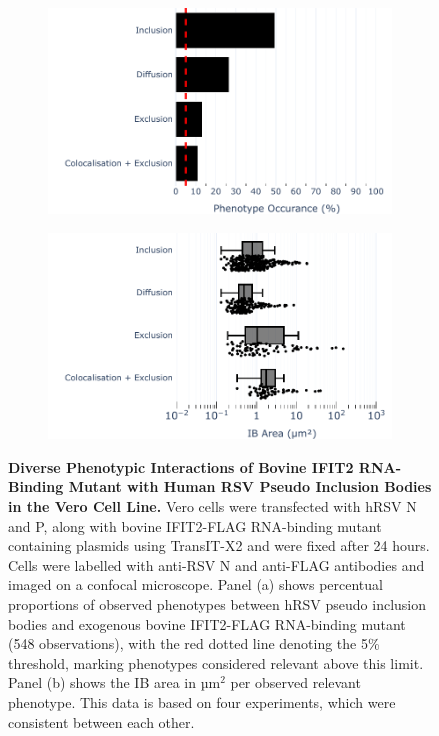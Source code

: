 \begin{figure}
    \begin{subfigure}{0.495\textwidth}
        \caption{}
        \includegraphics[width=1\linewidth]{09. Chapter 4/Figs/01. pIB/03. IFIT2/05. IFIT2-RNA binding mutant/02. pIB/01. bar_bi2f24_hnhp.pdf} 
    \end{subfigure}
    \begin{subfigure}{0.495\textwidth}
        \caption{}
        \includegraphics[width=1\linewidth]{09. Chapter 4/Figs/01. pIB/03. IFIT2/05. IFIT2-RNA binding mutant/02. pIB/02. box_bi2f24_hnhp.pdf}
    \end{subfigure}
    \caption[Diverse Phenotypic Interactions of Bovine IFIT2 RNA-Binding Mutant with Human RSV Pseudo Inclusion Bodies in the Vero Cell Line.]{\textbf{Diverse Phenotypic Interactions of Bovine IFIT2 RNA-Binding Mutant with Human RSV Pseudo Inclusion Bodies in the Vero Cell Line.} Vero cells were transfected with hRSV N and P, along with bovine IFIT2-FLAG RNA-binding mutant containing plasmids using TransIT-X2 and were fixed after 24 hours. Cells were labelled with anti-RSV N and anti-FLAG antibodies and imaged on a confocal microscope. Panel (a) shows percentual proportions of observed phenotypes between hRSV pseudo inclusion bodies and exogenous bovine IFIT2-FLAG RNA-binding mutant (548 observations), with the red dotted line denoting the 5\% threshold, marking phenotypes considered relevant above this limit. Panel (b) shows the IB area in \(\mbox{µm}^2\) per observed relevant phenotype. This data is based on four experiments, which were consistent between each other.}

\end{figure}
